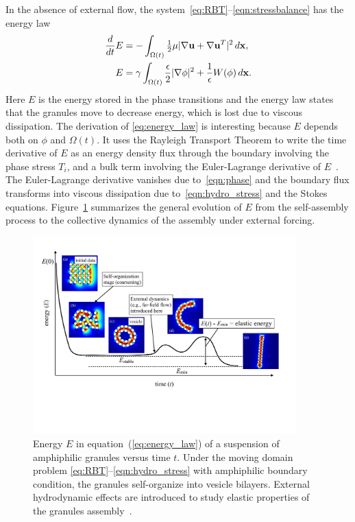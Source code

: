 In the absence of external flow, the
system~\eqref{eq:RBT}--\eqref{eqn:stressbalance} has the energy law
\begin{align}
\label{eq:energy_law}
  \begin{split}
  \frac{d}{dt}E
    &= - \int_{\Omega(t)}\tfrac{1}{2}\mu|\nabla \mathbf{u} + \nabla
  \mathbf{u}^T|^2 \,d\mathbf{x}, \\
    E &= \gamma \int_{\Omega(t)}
  \frac{\epsilon}{2} |\nabla \phi|^2 + \frac{1}{\epsilon} W(\phi) \,d\mathbf{x}.
  \end{split}
\end{align}
Here $E$ is the energy stored in the phase transitions
and the energy law states that
the granules move to decrease energy,
which is lost due to viscous dissipation.
The derivation of \eqref{eq:energy_law} is interesting
because $E$ depends both on $\phi$
and $\Omega(t)$. It uses the Rayleigh Transport Theorem to write the time
derivative of $E$ as an energy density flux through the boundary
involving the phase stress $T_i$, and a bulk term involving the Euler-Lagrange
derivative of $E$~\cite{Fu2018_SIAM}. The Euler-Lagrange derivative vanishes due
to~\eqref{eqn:phase} and the boundary flux transforms into viscous
dissipation due to~\eqref{eqn:hydro_stress} and the Stokes equations. Figure~\ref{fig:coarsening} summarizes the general evolution of $E$ from the self-assembly process to
the collective dynamics of the assembly under external forcing.
\begin{figure} 
  \includegraphics[width=4in]{figures/Background/coarsening.pdf}
  \vspace{-20pt}
  \caption{\label{fig:coarsening} \footnotesize Energy $E$ in
  equation~(\ref{eq:energy_law}) of a suspension of amphiphilic granules
  versus time $t$. Under the moving domain problem
  \eqref{eq:RBT}--\eqref{eqn:hydro_stress} with amphiphilic boundary
  condition, the granules self-organize into vesicle bilayers. External
  hydrodynamic effects are introduced to study elastic properties of
  the granules assembly~\cite{Fu2018_SIAM,FuQuRyYo22}.}
  \vspace{5pt}
\end{figure}

